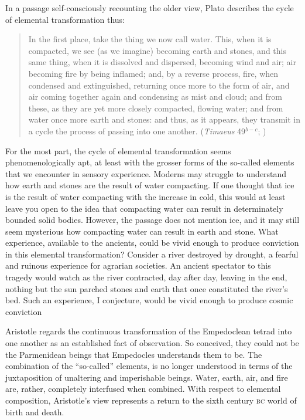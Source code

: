 In a passage self-consciously recounting the older view, Plato describes the cycle of elemental transformation thus:
\begin{quote}
	In the first place, take the thing we now call water. This, when it is compacted, we see (as we imagine) becoming earth and stones, and this same thing, when it is dissolved and dispersed, becoming wind and air; air becoming fire by being inflamed; and, by a reverse process, fire, when condensed and extinguished, returning once more to the form of air, and air coming together again and condensing as mist and cloud; and from these, as they are yet more closely compacted, flowing water; and from water once more earth and stones: and thus, as it appears, they transmit in a cycle the process of passing into one another. (\emph{Timaeus} 49\( ^{b-c} \); \citealt[179]{Cornford:1935fk})
\end{quote}
For the most part, the cycle of elemental transformation seems phenomenologically apt, at least with the grosser forms of the so-called elements that we encounter in sensory experience. Moderns may struggle to understand how earth and stones are the result of water compacting. If one thought that ice is the result of water compacting with the increase in cold, this would at least leave you open to the idea that compacting water can result in determinately bounded solid bodies. However, the passage does not mention ice, and it may still seem mysterious how compacting water can result in earth and stone. What experience, available to the ancients, could be vivid enough to produce conviction in this elemental transformation? Consider a river destroyed by drought, a fearful and ruinous experience for agrarian societies. An ancient spectator to this tragedy would watch as the river contracted, day after day, leaving in the end, nothing but the sun parched stones and earth that once constituted the river's bed. Such an experience, I conjecture, would be vivid enough to produce cosmic conviction

Aristotle regards the continuous transformation of the Empedoclean tetrad into one another as an established fact of observation. So conceived, they could not be the Parmenidean beings that Empedocles understands them to be. The combination of the ``so-called'' elements, is no longer understood in terms of the juxtaposition of unaltering and imperishable beings. Water, earth, air, and fire are, rather, completely interfused when combined. With respect to elemental composition, Aristotle's view represents a return to the sixth century \textsc{bc} world of birth and death.

